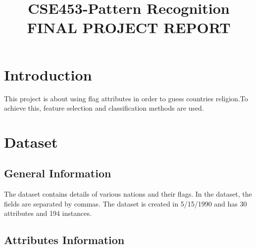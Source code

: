 \documentclass[conference]{IEEEtran}
\begin{document}
\title{CSE453-Pattern Recognition\\
FINAL PROJECT REPORT
}

\author{
}
\maketitle

\section{Introduction}
This project is about using flag attributes in order to guess countries religion.To achieve this, feature selection and classification methods are used.

\section{Dataset}

\subsection{General Information}

The dataset contains details of various nations and their flags. In the dataset, the fields are separated by commas. The dataset is created in 5/15/1990 and has 30 attributes and 194 instances.\cite{b1}

\subsection{Attributes Information}
\end{document}
